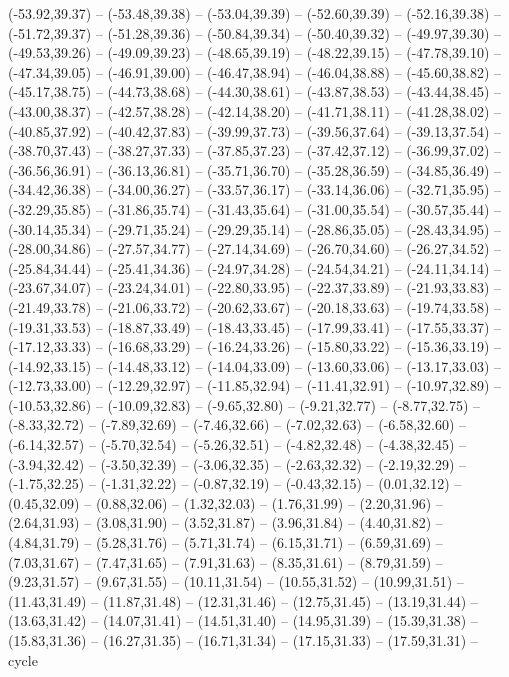 {  (-53.92,39.37) -- (-53.48,39.38) -- (-53.04,39.39) -- (-52.60,39.39) -- (-52.16,39.38) -- (-51.72,39.37) -- (-51.28,39.36) --
  (-50.84,39.34) -- (-50.40,39.32) -- (-49.97,39.30) -- (-49.53,39.26) -- (-49.09,39.23) -- (-48.65,39.19) -- (-48.22,39.15) --
  (-47.78,39.10) -- (-47.34,39.05) -- (-46.91,39.00) -- (-46.47,38.94) -- (-46.04,38.88) -- (-45.60,38.82) -- (-45.17,38.75) --
  (-44.73,38.68) -- (-44.30,38.61) -- (-43.87,38.53) -- (-43.44,38.45) -- (-43.00,38.37) -- (-42.57,38.28) -- (-42.14,38.20) --
  (-41.71,38.11) -- (-41.28,38.02) -- (-40.85,37.92) -- (-40.42,37.83) -- (-39.99,37.73) -- (-39.56,37.64) -- (-39.13,37.54) --
  (-38.70,37.43) -- (-38.27,37.33) -- (-37.85,37.23) -- (-37.42,37.12) -- (-36.99,37.02) -- (-36.56,36.91) -- (-36.13,36.81) --
  (-35.71,36.70) -- (-35.28,36.59) -- (-34.85,36.49) -- (-34.42,36.38) -- (-34.00,36.27) -- (-33.57,36.17) -- (-33.14,36.06) --
  (-32.71,35.95) -- (-32.29,35.85) -- (-31.86,35.74) -- (-31.43,35.64) -- (-31.00,35.54) -- (-30.57,35.44) -- (-30.14,35.34) --
  (-29.71,35.24) -- (-29.29,35.14) -- (-28.86,35.05) -- (-28.43,34.95) -- (-28.00,34.86) -- (-27.57,34.77) -- (-27.14,34.69) --
  (-26.70,34.60) -- (-26.27,34.52) -- (-25.84,34.44) -- (-25.41,34.36) -- (-24.97,34.28) -- (-24.54,34.21) -- (-24.11,34.14) --
  (-23.67,34.07) -- (-23.24,34.01) -- (-22.80,33.95) -- (-22.37,33.89) -- (-21.93,33.83) -- (-21.49,33.78) -- (-21.06,33.72) --
  (-20.62,33.67) -- (-20.18,33.63) -- (-19.74,33.58) -- (-19.31,33.53) -- (-18.87,33.49) -- (-18.43,33.45) -- (-17.99,33.41) --
  (-17.55,33.37) -- (-17.12,33.33) -- (-16.68,33.29) -- (-16.24,33.26) -- (-15.80,33.22) -- (-15.36,33.19) -- (-14.92,33.15) --
  (-14.48,33.12) -- (-14.04,33.09) -- (-13.60,33.06) -- (-13.17,33.03) -- (-12.73,33.00) -- (-12.29,32.97) -- (-11.85,32.94) --
  (-11.41,32.91) -- (-10.97,32.89) -- (-10.53,32.86) -- (-10.09,32.83) -- (-9.65,32.80) -- (-9.21,32.77) -- (-8.77,32.75) --
  (-8.33,32.72) -- (-7.89,32.69) -- (-7.46,32.66) -- (-7.02,32.63) -- (-6.58,32.60) -- (-6.14,32.57) -- (-5.70,32.54) --
  (-5.26,32.51) -- (-4.82,32.48) -- (-4.38,32.45) -- (-3.94,32.42) -- (-3.50,32.39) -- (-3.06,32.35) -- (-2.63,32.32) --
  (-2.19,32.29) -- (-1.75,32.25) -- (-1.31,32.22) -- (-0.87,32.19) -- (-0.43,32.15) -- (0.01,32.12) -- (0.45,32.09) --
  (0.88,32.06) -- (1.32,32.03) -- (1.76,31.99) -- (2.20,31.96) -- (2.64,31.93) -- (3.08,31.90) -- (3.52,31.87) --
  (3.96,31.84) -- (4.40,31.82) -- (4.84,31.79) -- (5.28,31.76) -- (5.71,31.74) -- (6.15,31.71) -- (6.59,31.69) --
  (7.03,31.67) -- (7.47,31.65) -- (7.91,31.63) -- (8.35,31.61) -- (8.79,31.59) -- (9.23,31.57) -- (9.67,31.55) --
  (10.11,31.54) -- (10.55,31.52) -- (10.99,31.51) -- (11.43,31.49) -- (11.87,31.48) -- (12.31,31.46) -- (12.75,31.45) --
  (13.19,31.44) -- (13.63,31.42) -- (14.07,31.41) -- (14.51,31.40) -- (14.95,31.39) -- (15.39,31.38) -- (15.83,31.36) --
  (16.27,31.35) -- (16.71,31.34) -- (17.15,31.33) -- (17.59,31.31) -- cycle}
